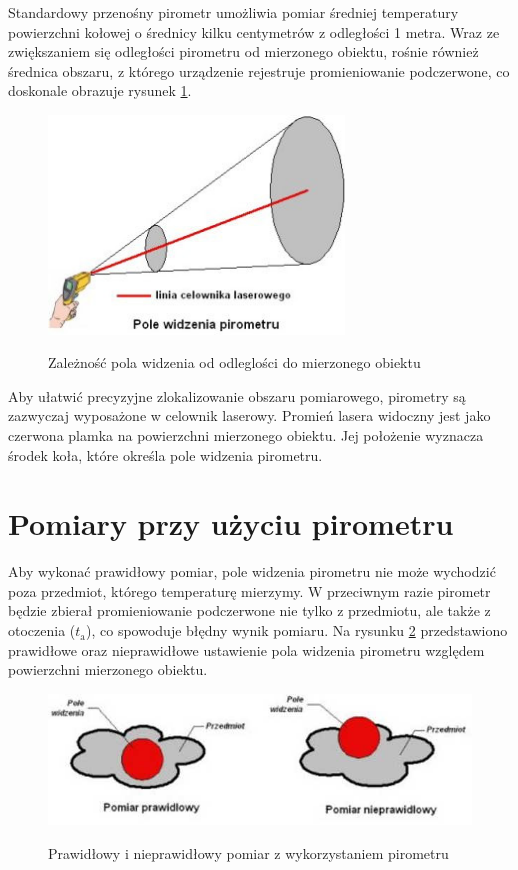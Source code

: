 Standardowy przenośny pirometr umożliwia pomiar średniej temperatury powierzchni kołowej o średnicy kilku centymetrów z odległości 1 metra. Wraz ze zwiększaniem się odległości pirometru od mierzonego obiektu, rośnie również średnica obszaru, z którego urządzenie rejestruje promieniowanie podczerwone, co doskonale obrazuje rysunek \ref{fig:pole}.

\begin{figure}[h!]
    \centering
    \includegraphics[width=0.7\textwidth]{images/pole.jpg}
    \caption{Zależność pola widzenia od odleglości do mierzonego obiektu} \cite{2}
    \label{fig:pole}
\end{figure}

\vspace{12pt}

Aby ułatwić precyzyjne zlokalizowanie obszaru pomiarowego, pirometry są zazwyczaj wyposażone w celownik laserowy. Promień lasera widoczny jest jako czerwona plamka na powierzchni mierzonego obiektu. Jej położenie wyznacza środek koła, które określa pole widzenia pirometru.

\section*{Pomiary przy użyciu pirometru}

Aby wykonać prawidłowy pomiar, pole widzenia pirometru nie może wychodzić poza przedmiot, którego temperaturę mierzymy. W przeciwnym razie pirometr będzie zbierał promieniowanie podczerwone nie tylko z przedmiotu, ale także z otoczenia ($t_\text{a}$), co spowoduje błędny wynik pomiaru. Na rysunku \ref{fig:pomiar} przedstawiono prawidłowe oraz nieprawidłowe ustawienie pola widzenia pirometru względem powierzchni mierzonego obiektu.

\begin{figure}[h!]
    \centering
    \includegraphics[width=1\textwidth]{images/pomiar.jpg}
    \caption{Prawidłowy i nieprawidłowy pomiar z wykorzystaniem pirometru} \cite{2}
    \label{fig:pomiar}
\end{figure}


